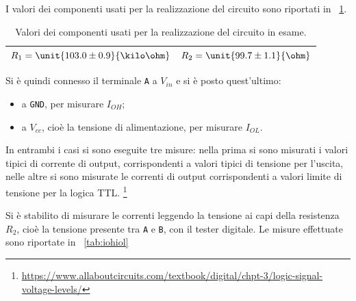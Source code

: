 \documentclass[a4paper,10pt]{article}
\def\code#1{\texttt{#1}}
\begin{document}
{I valori dei componenti usati per la realizzazione del circuito sono riportati in \tablename{~\ref{tab:valori}}. 

\begin{table}[H]
	\centering
	\begin{tabular}{c|c}
		\hline
		$R_1 = \unit{103.0 \pm 0.9}{\kilo\ohm}$ & $R_2 = \unit{99.7 \pm 1.1}{\ohm}$\\
		\hline
	\end{tabular}
	\caption{Valori dei componenti usati per la realizzazione del circuito in esame.}
	\label{tab:valori}
\end{table}

Si è quindi connesso il terminale \code{A} a $V_{in}$ e si è posto quest'ultimo:
\begin{itemize}
	\item a \code{GND}, per misurare $I_{OH}$;
	\item a $V_{cc}$, cioè la tensione di alimentazione, per misurare $I_{OL}$.
\end{itemize}

In entrambi i casi si sono eseguite tre misure: nella prima si sono misurati i valori tipici di corrente di output, corrispondenti a valori tipici di tensione per l'uscita, nelle altre si sono misurate le correnti di output corrispondenti a valori limite di tensione per la logica TTL. \footnote{\href{https://www.allaboutcircuits.com/textbook/digital/chpt-3/logic-signal-voltage-levels/}{https://www.allaboutcircuits.com/textbook/digital/chpt-3/logic-signal-voltage-levels/}}

Si è stabilito di misurare le correnti leggendo la tensione ai capi della resistenza $R_2$, cioè la tensione presente tra \code{A} e \code{B}, con il tester digitale. Le misure effettuate sono riportate in \tablename{~\ref{tab:iohiol}} 

}
\end{document}

